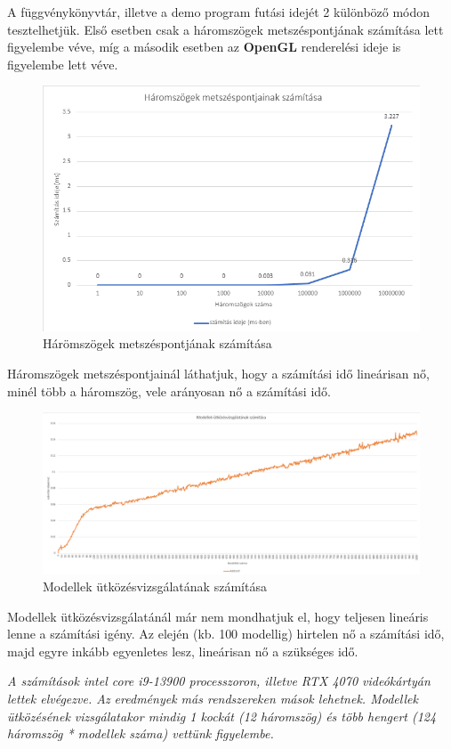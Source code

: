 A függvénykönyvtár, illetve a demo program futási idejét 2 különböző módon tesztelhetjük. Első esetben csak a háromszögek metszéspontjának számítása lett figyelembe véve, míg a második esetben az \textbf{OpenGL} renderelési ideje is figyelembe lett véve.

\begin{figure}[h]
	\centering
	\includegraphics[width=15truecm, height=9truecm]{images/háromszögek_száma.png}
	\caption{Hárömszögek metszéspontjának számítása}
	\label{fig:szam_1}
\end{figure}

Háromszögek metszéspontjainál láthatjuk, hogy a számítási idő lineárisan nő, minél több a háromszög, vele arányosan nő a számítási idő.

\newpage

\begin{figure}[h]
	\centering
	\includegraphics[width=15truecm, height=13truecm]{images/modellek_számítása.png}
	\caption{Modellek ütközésvizsgálatának számítása}
	\label{fig:szam_2}
\end{figure}

Modellek ütközésvizsgálatánál már nem mondhatjuk el, hogy teljesen lineáris lenne a számítási igény. Az elején (kb. 100 modellig) hirtelen nő a számítási idő, majd egyre inkább egyenletes lesz, lineárisan nő a szükséges idő.

\vspace*{\fill}\textit{A számítások intel core i9-13900 processzoron, illetve RTX 4070 videókártyán lettek elvégezve. Az eredmények más rendszereken mások lehetnek. Modellek ütközésének vizsgálatakor mindig 1 kockát (12 háromszög) és több hengert (124 háromszög * modellek száma) vettünk figyelembe.}